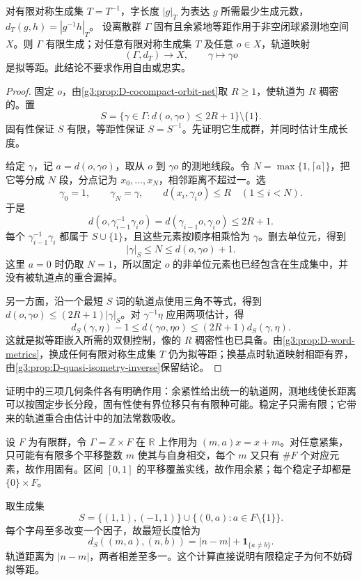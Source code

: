 \begin{theorem}\label{g3:thm:D-svarc-milnor}
	对有限对称生成集 \(T=T^{-1}\)，字长度 \(|g|_T\) 为表达 \(g\) 所需最少生成元数，\(d_T(g,h)=|g^{-1}h|_T\)。
	设离散群 \(\Gamma\) 固有且余紧地等距作用于非空闭球紧测地空间 \(X\)。则 \(\Gamma\) 有限生成；对任意有限对称生成集 \(T\) 及任意 \(o\in X\)，轨道映射
	\[
		(\Gamma,d_T)\longrightarrow X,\qquad\gamma\longmapsto\gamma o
	\]
	是拟等距。此结论不要求作用自由或忠实。
\end{theorem}
\begin{proof}
	固定 \(o\)，由\cref{g3:prop:D-cocompact-orbit-net}取 \(R\ge1\)，使轨道为 \(R\) 稠密的。置
	\[
		S=\{\gamma\in\Gamma:d(o,\gamma o)\le2R+1\}\setminus\{1\}.
	\]
	固有性保证 \(S\) 有限，等距性保证 \(S=S^{-1}\)。先证明它生成群，并同时估计生成长度。

	给定 \(\gamma\)，记 \(a=d(o,\gamma o)\)，取从 \(o\) 到 \(\gamma o\) 的测地线段。令 \(N=\max\{1,\lceil a\rceil\}\)，把它等分成 \(N\) 段，分点记为 \(x_0,\ldots,x_N\)，相邻距离不超过一。选
	\[
		\gamma_0=1,\qquad\gamma_N=\gamma,\qquad
		d(x_i,\gamma_i o)\le R\quad(1\le i<N).
	\]
	于是
	\[
		d(o,\gamma_{i-1}^{-1}\gamma_i o)
		=d(\gamma_{i-1}o,\gamma_i o)\le2R+1.
	\]
	每个 \(\gamma_{i-1}^{-1}\gamma_i\) 都属于 \(S\cup\{1\}\)，且这些元素按顺序相乘恰为 \(\gamma\)。删去单位元，得到
	\begin{equation}\label{g3:eq:D-svarc-milnor-length}
		|\gamma|_S\le N\le d(o,\gamma o)+1.
	\end{equation}
	这里 \(a=0\) 时仍取 \(N=1\)，所以固定 \(o\) 的非单位元素也已经包含在生成集中，并没有被轨道点的重合漏掉。

	另一方面，沿一个最短 \(S\) 词的轨道点使用三角不等式，得到
	\(d(o,\gamma o)\le(2R+1)|\gamma|_S\)。对 \(\gamma^{-1}\eta\) 应用两项估计，得
	\begin{equation}\label{g3:eq:D-svarc-milnor-bounds}
		d_S(\gamma,\eta)-1
		\le d(\gamma o,\eta o)
		\le(2R+1)d_S(\gamma,\eta).
	\end{equation}
	这就是拟等距嵌入所需的双侧控制，像的 \(R\) 稠密性也已具备。由\cref{g3:prop:D-word-metrics}，换成任何有限对称生成集 \(T\) 仍为拟等距；换基点时轨道映射相距有界，由\cref{g3:prop:D-quasi-isometry-inverse}保留结论。
\end{proof}

证明中的三项几何条件各有明确作用：余紧性给出统一的轨道网，测地线使长距离可以按固定步长分段，固有性使有界位移只有有限种可能。稳定子只需有限；它带来的轨道重合由估计中的加法常数吸收。

\begin{example}\label{g3:exm:D-finite-stabilizer}
	设 \(F\) 为有限群，令 \(\Gamma=\mathbb Z\times F\) 在 \(\mathbb R\) 上作用为
	\((m,a)x=x+m\)。对任意紧集，只可能有有限多个平移整数 \(m\) 使其与自身相交，每个 \(m\) 又只有 \(\#F\) 个对应元素，故作用固有。区间 \([0,1]\) 的平移覆盖实线，故作用余紧；每个稳定子却都是 \(\{0\}\times F\)。

	取生成集
	\[
		S=\{(1,1),(-1,1)\}\cup\{(0,a):a\in F\setminus\{1\}\}.
	\]
	每个字母至多改变一个因子，故最短长度恰为
	\[
		d_S((m,a),(n,b))=|n-m|+\mathbf1_{\{a\ne b\}}.
	\]
	轨道距离为 \(|n-m|\)，两者相差至多一。这个计算直接说明有限稳定子为何不妨碍拟等距。
\end{example}

